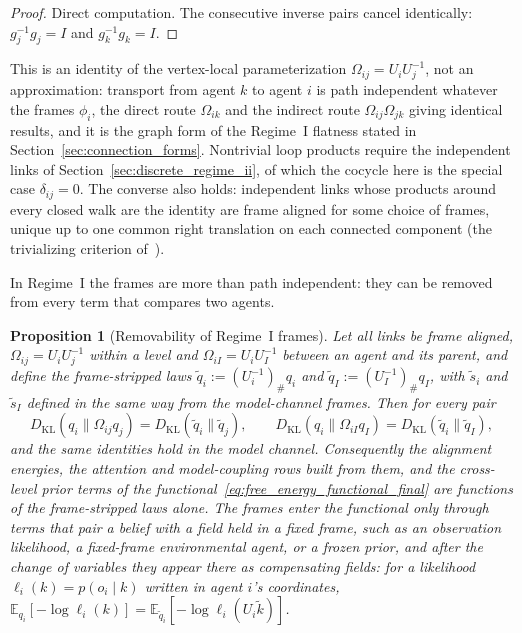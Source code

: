 \documentclass[11pt]{article}
\newtheorem{proposition}{Proposition}
\begin{document}
\begin{proof}
Direct computation. The consecutive inverse pairs cancel identically: $g_j^{-1} g_j = I$ and $g_k^{-1} g_k = I$.
\end{proof}

This is an identity of the vertex-local parameterization $\Omega_{ij} = U_iU_j^{-1}$, not an approximation: transport from agent $k$ to agent $i$ is path independent whatever the frames $\phi_i$, the direct route $\Omega_{ik}$ and the indirect route $\Omega_{ij}\Omega_{jk}$ giving identical results, and it is the graph form of the Regime~I flatness stated in Section~\ref{sec:connection_forms}. Nontrivial loop products require the independent links of Section~\ref{sec:discrete_regime_ii}, of which the cocycle here is the special case $\delta_{ij} = 0$. The converse also holds: independent links whose products around every closed walk are the identity are frame aligned for some choice of frames, unique up to one common right translation on each connected component (the trivializing criterion of~\cite[Ch.~2]{DennisGaugeVFE2026}).

In Regime~I the frames are more than path independent: they can be removed from every term that compares two agents.

\begin{proposition}[Removability of Regime~I frames]
\label{prop:regime1_removability}
Let all links be frame aligned, $\Omega_{ij} = U_iU_j^{-1}$ within a level and $\Omega_{iI} = U_iU_I^{-1}$ between an agent and its parent, and define the frame-stripped laws $\tilde q_i := (U_i^{-1})_\# q_i$ and $\tilde q_I := (U_I^{-1})_\# q_I$, with $\tilde s_i$ and $\tilde s_I$ defined in the same way from the model-channel frames. Then for every pair
\begin{equation}
D_{\mathrm{KL}}(q_i \| \Omega_{ij} q_j) = D_{\mathrm{KL}}(\tilde q_i \| \tilde q_j),
\qquad
D_{\mathrm{KL}}(q_i \| \Omega_{iI} q_I) = D_{\mathrm{KL}}(\tilde q_i \| \tilde q_I),
\label{eq:regime1_removability}
\end{equation}
and the same identities hold in the model channel. Consequently the alignment energies, the attention and model-coupling rows built from them, and the cross-level prior terms of the functional~\eqref{eq:free_energy_functional_final} are functions of the frame-stripped laws alone. The frames enter the functional only through terms that pair a belief with a field held in a fixed frame, such as an observation likelihood, a fixed-frame environmental agent, or a frozen prior, and after the change of variables they appear there as compensating fields: for a likelihood $\ell_i(k) = p(o_i \mid k)$ written in agent $i$'s coordinates, $\mathbb{E}_{q_i}[-\log \ell_i(k)] = \mathbb{E}_{\tilde q_i}[-\log \ell_i(U_i\tilde k)]$.
\end{proposition}
\end{document}
